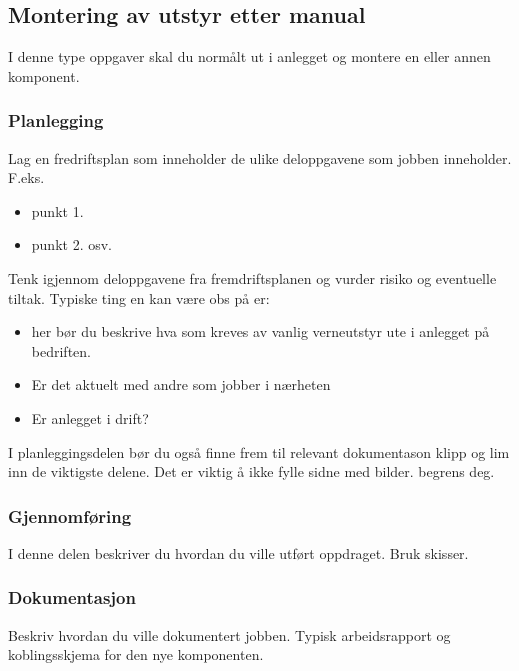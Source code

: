 \subsection{Montering av utstyr etter manual}
I denne type oppgaver skal du normålt ut i anlegget og montere en eller annen komponent. 
\subsubsection*{Planlegging}
Lag en fredriftsplan som inneholder de ulike deloppgavene  som jobben inneholder. 
F.eks. 
\begin{itemize}
	\item punkt 1. 
	\item punkt 2.  osv. 

\end{itemize}


Tenk igjennom deloppgavene fra fremdriftsplanen og vurder risiko og eventuelle tiltak. Typiske ting en kan være obs på er:
\begin{itemize}
	\item her bør du beskrive hva som kreves av vanlig verneutstyr ute i anlegget på bedriften.
	\item Er det aktuelt med andre som jobber i nærheten
	\item Er anlegget i drift?
\end{itemize}

\vskip 5pt 
I planleggingsdelen bør du  også finne frem til relevant dokumentason klipp og lim inn de viktigste delene. Det er viktig å ikke fylle sidne med bilder. begrens deg.  

\subsubsection*{Gjennomføring}

I denne delen beskriver du hvordan du ville utført oppdraget. Bruk skisser. 


\subsubsection*{Dokumentasjon}

Beskriv hvordan du ville dokumentert jobben. Typisk arbeidsrapport og koblingsskjema for den nye komponenten. 



\filbreak


\vskip 10pt




